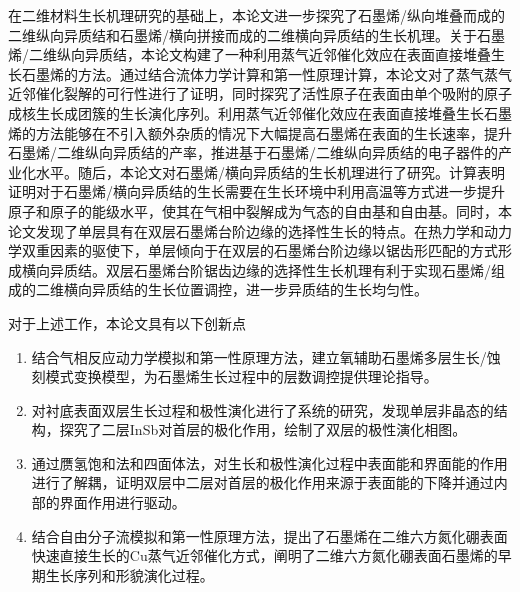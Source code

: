 在二维材料生长机理研究的基础上，本论文进一步探究了石墨烯/纵向堆叠而成的二维纵向异质结和石墨烯/横向拼接而成的二维横向异质结的生长机理。关于石墨烯/二维纵向异质结，本论文构建了一种利用蒸气近邻催化效应在表面直接堆叠生长石墨烯的方法。通过结合流体力学计算和第一性原理计算，本论文对了蒸气蒸气近邻催化裂解的可行性进行了证明，同时探究了活性原子在表面由单个吸附的原子成核生长成团簇的生长演化序列。利用蒸气近邻催化效应在表面直接堆叠生长石墨烯的方法能够在不引入额外杂质的情况下大幅提高石墨烯在表面的生长速率，提升石墨烯/二维纵向异质结的产率，推进基于石墨烯/二维纵向异质结的电子器件的产业化水平。随后，本论文对石墨烯/横向异质结的生长机理进行了研究。计算表明证明对于石墨烯/横向异质结的生长需要在生长环境中利用高温等方式进一步提升原子和原子的能级水平，使其在气相中裂解成为气态的自由基和自由基。同时，本论文发现了单层具有在双层石墨烯台阶边缘的选择性生长的特点。在热力学和动力学双重因素的驱使下，单层倾向于在双层的石墨烯台阶边缘以锯齿形匹配的方式形成横向异质结。双层石墨烯台阶锯齿边缘的选择性生长机理有利于实现石墨烯/组成的二维横向异质结的生长位置调控，进一步异质结的生长均匀性。

对于上述工作，本论文具有以下创新点\chinesecolon
\begin{enumerate}[labelsep=0em,label=（\arabic*）,wide]
    \item 结合气相反应动力学模拟和第一性原理方法，建立氧辅助石墨烯多层生长/蚀刻模式变换模型，为石墨烯生长过程中的层数调控提供理论指导。
    \item 对衬底表面双层生长过程和极性演化进行了系统的研究，发现单层非晶态的结构，探究了二层InSb对首层的极化作用，绘制了双层的极性演化相图。
    \item 通过赝氢饱和法和四面体法，对生长和极性演化过程中表面能和界面能的作用进行了解耦，证明双层中二层对首层的极化作用来源于表面能的下降并通过内部的界面作用进行驱动。
    \item 结合自由分子流模拟和第一性原理方法，提出了石墨烯在二维六方氮化硼表面快速直接生长的Cu蒸气近邻催化方式，阐明了二维六方氮化硼表面石墨烯的早期生长序列和形貌演化过程。
\end{enumerate}
